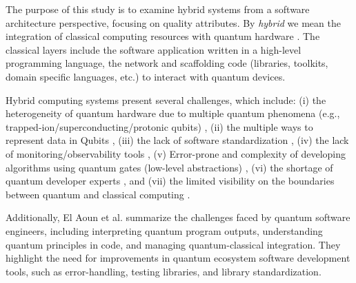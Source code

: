 The purpose of this study is to examine hybrid systems from a software architecture perspective, focusing on quality attributes. By \emph{hybrid} we mean the integration of classical computing resources with quantum hardware \cite{Sodhi2021}. The classical layers include the software application written in a high-level programming language, the network and scaffolding code (libraries, toolkits, domain specific languages, etc.) to interact with quantum devices. %

Hybrid computing systems present several challenges, which include: (i) the heterogeneity of quantum hardware due to multiple quantum phenomena (e.g., trapped-ion/superconducting/protonic qubits) \cite{Elsharkawy2023} \cite{Sodhi2021}, (ii) the multiple ways to represent data in Qubits \cite{Moguel2022}, (iii) the lack of software standardization \cite{Elsharkawy2023} \cite{Cerezo2022} \cite{Sodhi2021}, (iv) the lack of monitoring/observability tools \cite{Moguel2022} \cite{40}, (v) Error-prone and complexity of developing algorithms using quantum gates (low-level abstractions) \cite{Sodhi2021}, (vi) the shortage of quantum developer experts \cite{Sodhi2021}, and (vii) the limited visibility on the boundaries between quantum and classical computing \cite{Vietz2021}.

Additionally, El Aoun et al. \cite{el_aoun2021understanding} summarize the challenges faced by quantum software engineers, including interpreting quantum program outputs, understanding quantum principles in code, and managing quantum-classical integration. They highlight the need for improvements in quantum ecosystem software development tools, such as error-handling, testing libraries, and library standardization.


